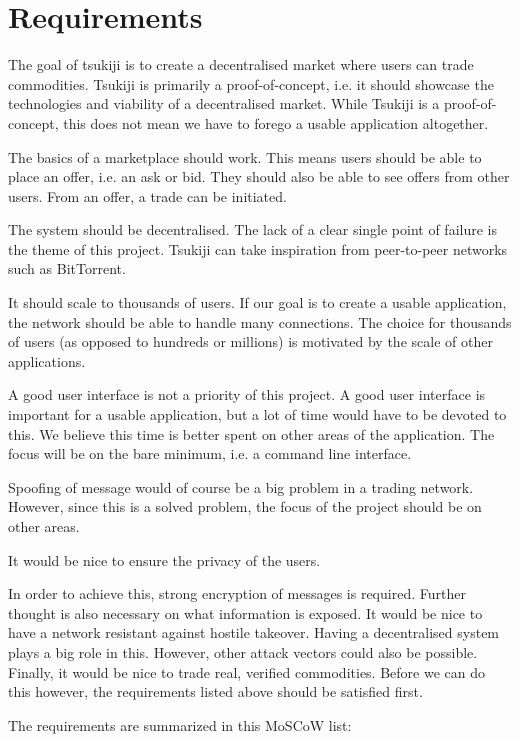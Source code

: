 \section{Requirements}
The goal of tsukiji is to create a decentralised market where users can trade commodities.
Tsukiji is primarily a proof-of-concept, i.e. it should showcase the technologies and viability of a decentralised market.
While Tsukiji is a proof-of-concept, this does not mean we have to forego a usable application altogether.

The basics of a marketplace should work.
This means users should be able to place an offer, i.e. an ask or bid.
They should also be able to see offers from other users.
From an offer, a trade can be initiated.

The system should be decentralised.
The lack of a clear single point of failure is the theme of this project.
Tsukiji can take inspiration from peer-to-peer networks such as BitTorrent.

It should scale to thousands of users.
If our goal is to create a usable application, the network should be able to handle many connections.
The choice for thousands of users (as opposed to hundreds or millions) is motivated by the scale of other applications. %

A good user interface is not a priority of this project.
A good user interface is important for a usable application, but a lot of time would have to be devoted to this.
We believe this time is better spent on other areas of the application.
The focus will be on the bare minimum, i.e. a command line interface.

Spoofing of message would of course be a big problem in a trading network.
However, since this is a solved problem, the focus of the project should be on other areas.

It would be nice to ensure the privacy of the users.

In order to achieve this, strong encryption of messages is required.
Further thought is also necessary on what information is exposed.
It would be nice to have a network resistant against hostile takeover.
Having a decentralised system plays a big role in this.
However, other attack vectors could also be possible.
Finally, it would be nice to trade real, verified commodities.
Before we can do this however, the requirements listed above should be satisfied first.


The requirements are summarized in this MoSCoW list: \\

